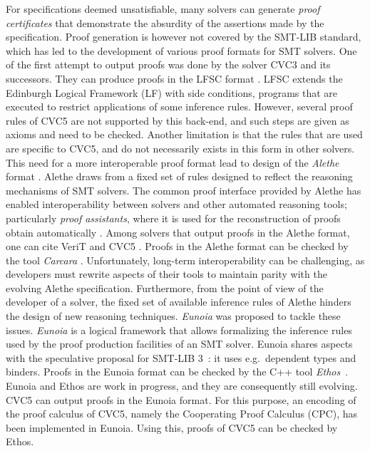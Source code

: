 \documentclass[class=llncs, crop=false]{standalone}
\begin{document}
For specifications deemed unsatisfiable, many solvers
can generate \emph{proof certificates} that demonstrate
the absurdity of the assertions made by the specification.
%
Proof generation is however not covered by the SMT-LIB
standard, which has led to the development of various proof
formats for SMT solvers.
One of the first attempt to output proofs was done by the solver CVC3
and its successors. They can produce proofs in the LFSC format
\cite{DBLP:journals/fmsd/StumpORHT13}. LFSC extends the Edinburgh
Logical Framework (LF) with side conditions, programs that are
executed to restrict applications of some inference rules. However,
several proof rules of CVC5 are not supported by this back-end, and
such steps are given as axioms and need to be checked. Another
limitation is that the rules that are used are specific to CVC5, and
do not necessarily exists in this form in other solvers.
%
This need for a more interoperable proof format lead to design of the
\emph{Alethe} format \cite{schurrAletheGenericSMT2021}.  Alethe draws from a fixed set of rules designed
to reflect the reasoning mechanisms of SMT solvers.
%
The common proof interface provided by Alethe has
enabled interoperability between solvers and other
automated reasoning tools;
particularly \emph{proof assistants}, where it is used for the
reconstruction of
proofs obtain automatically
\cite{DBLP:conf/cpp/ArmandFGKTW11,DBLP:conf/cade/SchurrFD21}. Among solvers
that output proofs
in the Alethe format, one can cite VeriT
\cite{DBLP:conf/cade/BoutonODF09} and CVC5 \cite{Barbosa2022}.
%
Proofs in the Alethe format can be checked by the tool
\textit{Carcara} \cite{andreottiCarcaraEfficientProof2023}.
Unfortunately, long-term interoperability can be
challenging, as developers must rewrite aspects
of their tools to maintain parity with the evolving
Alethe specification. Furthermore, from the  point of view of the developer of a
solver, the fixed set of available inference rules of Alethe hinders
the design of new reasoning techniques.
%
\textit{Eunoia} was proposed to tackle these issues. \textit{Eunoia} is a logical framework that allows formalizing
the inference rules used by the proof production facilities
of an SMT solver. Eunoia shares aspects with the speculative proposal
for SMT-LIB 3~\cite{smt3-proposal}: it uses e.g.\ dependent types and binders.
%
Proofs in the
Eunoia format can be checked by the C++ tool
\textit{Ethos}~\cite{EthosUser_manualmdMain}. Eunoia and Ethos are
work in progress, and they are consequently still evolving.
CVC5 can output proofs in the Eunoia format. For this purpose, an
encoding of the proof calculus of CVC5, namely the Cooperating Proof
Calculus (CPC), has been implemented in Eunoia. Using this, proofs of
CVC5 can be checked by Ethos.
\end{document}
